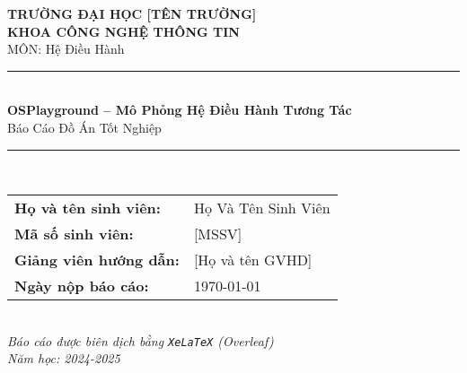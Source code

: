 \documentclass[12pt,a4paper]{report}
\title{\reporttitle}
\author{\studentname}
\date{\dateofreport}
\newcommand{\university}{TRƯỜNG ĐẠI HỌC [TÊN TRƯỜNG]}
\newcommand{\faculty}{KHOA CÔNG NGHỆ THÔNG TIN}
\newcommand{\course}{MÔN: Hệ Điều Hành}
\newcommand{\reporttitle}{OSPlayground – Mô Phỏng Hệ Điều Hành Tương Tác}
\newcommand{\studentname}{Họ Và Tên Sinh Viên}
\newcommand{\studentid}{[MSSV]}
\newcommand{\instructor}{[Họ và tên GVHD]}
\newcommand{\dateofreport}{\today}
\begin{document}
\begin{titlepage}
  \begin{center}
    {\Large \textbf{\university}}\\[4pt]
    {\large \textbf{\faculty}}\\[20pt]
    {\large \course}\\[24pt]
    \rule{0.8\linewidth}{0.6pt}\\[12pt]
    {\LARGE \textbf{\reporttitle}}\\[8pt]
    {\large Báo Cáo Đồ Án Tốt Nghiệp}
    \rule{0.8\linewidth}{0.6pt}\\[32pt]
    \vspace{8pt}
    \begin{tabular}{p{3.5cm}l}
      \textbf{Họ và tên sinh viên:} & \studentname\\[8pt]
      \textbf{Mã số sinh viên:} & \studentid\\[8pt]
      \textbf{Giảng viên hướng dẫn:} & \instructor\\[8pt]
      \textbf{Ngày nộp báo cáo:} & \dateofreport\\[8pt]
    \end{tabular}
    \\
    \vfill
    {\small \textit{Báo cáo được biên dịch bằng \texttt{XeLaTeX} (Overleaf)}}\\
    {\small \textit{Năm học: 2024-2025}}
  \end{center}
\end{titlepage}

\clearpage




\setcounter{page}{1}












\end{document}
